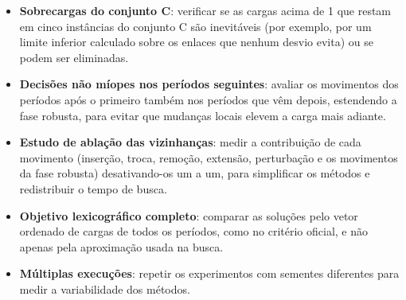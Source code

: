 \begin{itemize}
    \item \textbf{Sobrecargas do conjunto C}: verificar se as cargas acima de 1 que restam em cinco instâncias do conjunto C são inevitáveis (por exemplo, por um limite inferior calculado sobre os enlaces que nenhum desvio evita) ou se podem ser eliminadas.
    \item \textbf{Decisões não míopes nos períodos seguintes}: avaliar os movimentos dos períodos após o primeiro também nos períodos que vêm depois, estendendo a fase robusta, para evitar que mudanças locais elevem a carga mais adiante.
    \item \textbf{Estudo de ablação das vizinhanças}: medir a contribuição de cada movimento (inserção, troca, remoção, extensão, perturbação e os movimentos da fase robusta) desativando-os um a um, para simplificar os métodos e redistribuir o tempo de busca.
    \item \textbf{Objetivo lexicográfico completo}: comparar as soluções pelo vetor ordenado de cargas de todos os períodos, como no critério oficial, e não apenas pela aproximação usada na busca.
    \item \textbf{Múltiplas execuções}: repetir os experimentos com sementes diferentes para medir a variabilidade dos métodos.
\end{itemize}
